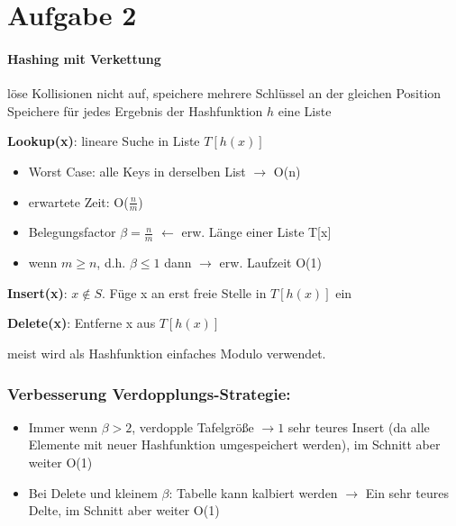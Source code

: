 \documentclass[10pt,a4paper]{article}
\begin{document}

\section*{Aufgabe 2}
\paragraph{Hashing mit Verkettung} löse Kollisionen nicht auf, speichere mehrere Schlüssel an der gleichen Position
\\

Speichere für jedes Ergebnis der Hashfunktion $h$ eine Liste

\textbf{Lookup(x)}: lineare Suche in Liste $T[h(x)]$ \\ 
\begin{itemize}
    \item Worst Case: alle Keys in derselben List $\rightarrow$ O(n)
    \item erwartete Zeit: O($\frac{n}{m}$)
    \item Belegungsfactor $\beta = \frac{n}{m}$ $\leftarrow$ erw. Länge einer Liste T[x]
    \item wenn $m \geq n$, d.h. $\beta \leq 1$ dann $\rightarrow$ erw. Laufzeit O(1)
\end{itemize}
        

\textbf{Insert(x)}: $x\notin S.$ Füge x an erst freie Stelle in $T[h(x)]$ ein

\textbf{Delete(x)}: Entferne x aus $T[h(x)]$

\begin{center}
	\resizebox{.6\columnwidth}{!}{
		
	}
\end{center}
meist wird als Hashfunktion einfaches Modulo verwendet.

\subsubsection*{Verbesserung Verdopplungs-Strategie:}

\begin{itemize}
    \item Immer wenn $\beta>2$, verdopple Tafelgröße $\rightarrow1$ sehr teures Insert (da alle Elemente mit neuer Hashfunktion umgespeichert werden), im Schnitt aber weiter O(1)\\ 
    \item Bei Delete und kleinem $\beta$: Tabelle kann kalbiert werden $\rightarrow$ Ein sehr teures Delte, im Schnitt aber weiter O(1)
\end{itemize}
\end{document}
